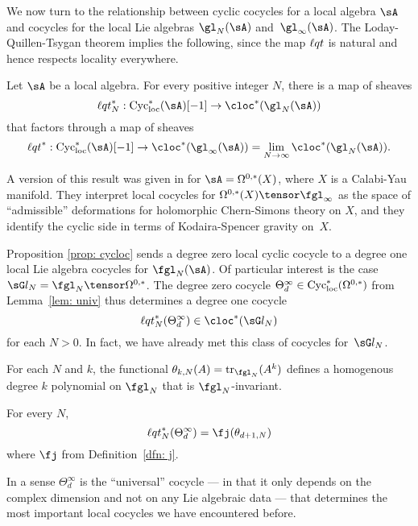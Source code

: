We now turn to the relationship between cyclic cocycles for a local algebra $\sA$ and cocycles for the local Lie algebras $\gl_N( \sA)$ and~$\gl_\infty (\sA)$.
The Loday-Quillen-Tsygan theorem implies the following,
since the map ${\ell q t}$ is natural and hence respects locality everywhere.

\begin{prop}
\label{prop: cycloc}
Let $\sA$ be a local algebra.
For every positive integer $N$, there is a map of sheaves
\[
\lqt_N^* : \Cycloc^*(\sA)[-1] \to \cloc^*(\gl_N( \sA)) 
\] 
that factors through a map of sheaves
\[
\lqt^* : \Cycloc^*(\sA)[-1] \to \cloc^*(\gl_\infty( \sA)) = \lim_{N \to \infty} \cloc^*(\gl_N( \sA))  .
\]
\end{prop}

\begin{rmk}
A version of this result was given in \cite{CL1} for $\sA = \Omega^{0,*}(X)$, 
where $X$ is a Calabi-Yau manifold.
They interpret local cocycles for $\Omega^{0,*}(X) \tensor \fgl_\infty$ as the space of ``admissible'' deformations for holomorphic Chern-Simons theory on $X$,
and they identify the cyclic side in terms of Kodaira-Spencer gravity on~$X$.
\end{rmk}

Proposition \ref{prop: cycloc} sends a degree zero local cyclic cocycle to a degree one local Lie algebra cocycles for $\fgl_N(\sA)$.
Of particular interest is the case $\sG l_{N} = \fgl_N \tensor \Omega^{0,*}$. 
The degree zero cocycle $\Theta_d^\infty \in {\rm Cyc}_{\rm loc}^*(\Omega^{0,*})$ from Lemma~\ref{lem: univ} thus determines a degree one cocycle 
\[
\lqt^*_N(\Theta_d^\infty) \in \cloc^*(\sG l_N)
\]
for each $N > 0$. 
In fact, we have already met this class of cocycles for~$\sG l_{N}$. 

\begin{dfn}
For each $N$ and $k$, the functional $\theta_{k,N}(A) = {\rm tr}_{\fgl_N} (A^k)$ defines a homogenous degree $k$ polynomial on $\fgl_N$ that is $\fgl_N$-invariant.
\end{dfn}

\begin{lem}
\label{lem:pullbackofthetainfinity}
For every $N$, 
\[
\lqt_N^*(\Theta_d^\infty) = \fj(\theta_{d+1, N})
\]
where $\fj$ from Definition~\ref{dfn: j}.
\end{lem}

In a sense $\Theta^\infty_d$ is the ``universal'' cocycle --- in that it only depends on the complex dimension and not on any Lie algebraic data --- that determines the most important local cocycles we have encountered before.

